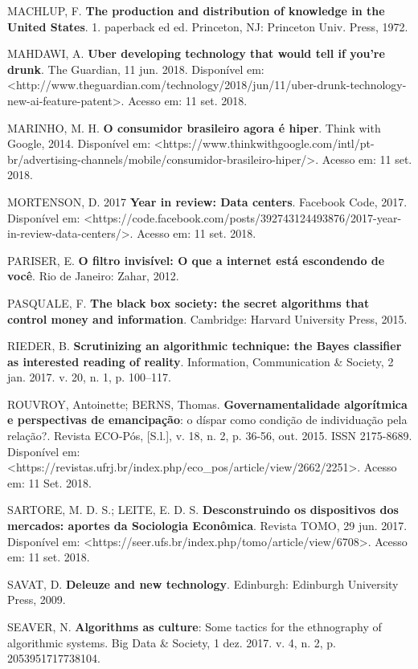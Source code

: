 MACHLUP, F. \textbf{The production and distribution of knowledge in the
United States}. 1. paperback ed ed. Princeton, NJ: Princeton Univ.
Press, 1972.

MAHDAWI, A. \textbf{Uber developing technology that would tell if you're
drunk}. The Guardian, 11 jun. 2018. Disponível em:
\textless{}http://www.theguardian.com/technology/2018/jun/11/uber-drunk-technology-new-ai-feature-patent\textgreater{}.
Acesso em: 11 set. 2018.

MARINHO, M. H. \textbf{O consumidor brasileiro agora é hiper}. Think
with Google, 2014. Disponível em:
\textless{}https://www.thinkwithgoogle.com/intl/pt-br/advertising-channels/mobile/consumidor-brasileiro-hiper/\textgreater{}.
Acesso em: 11 set. 2018.

MORTENSON, D. 2017 \textbf{Year in review: Data centers}. Facebook Code,
2017. Disponível em:
\textless{}https://code.facebook.com/posts/392743124493876/2017-year-in-review-data-centers/\textgreater{}.
Acesso em: 11 set. 2018.

PARISER, E. \textbf{O filtro invisível: O que a internet está escondendo
de você}. Rio de Janeiro: Zahar, 2012.

PASQUALE, F. \textbf{The black box society: the secret algorithms that
control money and information}. Cambridge: Harvard University Press,
2015.

RIEDER, B. \textbf{Scrutinizing an algorithmic technique: the Bayes
classifier as interested reading of reality}. Information, Communication
\& Society, 2 jan. 2017. v. 20, n. 1, p. 100--117.

ROUVROY, Antoinette; BERNS, Thomas. \textbf{Governamentalidade
algorítmica e perspectivas de emancipação}: o díspar como condição de
individuação pela relação?. Revista ECO-Pós, {[}S.l.{]}, v. 18, n. 2, p.
36-56, out. 2015. ISSN 2175-8689. Disponível em:
\textless{}https://revistas.ufrj.br/index.php/eco\_pos/article/view/2662/2251\textgreater{}.
Acesso em: 11 Set. 2018.

SARTORE, M. D. S.; LEITE, E. D. S. \textbf{Desconstruindo os
dispositivos dos mercados: aportes da Sociologia Econômica}. Revista
TOMO, 29 jun. 2017. Disponível em:
\textless{}https://seer.ufs.br/index.php/tomo/article/view/6708\textgreater{}.
Acesso em: 11 set. 2018.

SAVAT, D. \textbf{Deleuze and new technology}. Edinburgh: Edinburgh
University Press, 2009.

SEAVER, N. \textbf{Algorithms as culture}: Some tactics for the
ethnography of algorithmic systems. Big Data \& Society, 1 dez. 2017. v.
4, n. 2, p. 2053951717738104.

